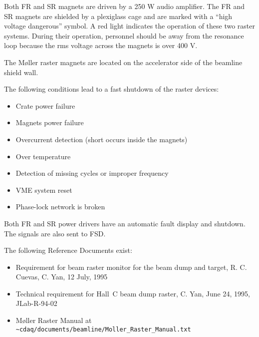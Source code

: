 Both FR and SR magnets are driven by a 250 W audio amplifier. The FR
and SR magnets are shielded by a plexiglass cage and are marked with a
``high voltage dangerous'' symbol.  A red light indicates the
operation of these two raster systems. During their operation, personnel
should be away from the resonance loop because the rms voltage across
the magnets is over 400 V.

The M\o ller raster magnets are located on the accelerator side of the
beamline shield wall.

The following conditions lead to a fast shutdown of the raster devices:
\begin{itemize}
\item{Crate power failure}
\item{Magnets power failure}
\item{Overcurrent detection (short occurs inside the magnets)}
\item{Over temperature}
\item{Detection of missing cycles or improper frequency}
\item{VME system reset}
\item{Phase-lock network is broken}
\end{itemize}

\noindent Both FR and SR power drivers have an automatic fault display and
shutdown. The signals are also sent to FSD.

The following Reference Documents exist:
\begin{itemize}
\item{Requirement for beam raster monitor for the beam dump and target,
R. C. Cuevas, C. Yan, 12 July, 1995}
\item{Technical requirement for Hall~C beam dump raster,
C. Yan, June 24, 1995, JLab-R-94-02}
\item{M\o ller Raster Manual at \nolinkurl{~cdaq/documents/beamline/Moller_Raster_Manual.txt}}
\end{itemize}
